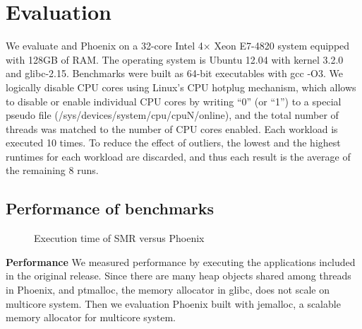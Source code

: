\section{Evaluation}
We evaluate \myds and Phoenix on 
a 32-core Intel 4× Xeon E7-4820 system equipped with 128GB of RAM. 
The operating system is Ubuntu 12.04 with kernel 3.2.0 and glibc-2.15.
Benchmarks were built as 64-bit executables with gcc -O3.
We logically disable CPU cores using Linux’s CPU hotplug mechanism, 
which allows to disable or enable individual CPU cores 
by writing “0” (or “1”) to 
a special pseudo file (/sys/devices/system/cpu/cpuN/online), 
and the total number of threads was matched to the number of CPU cores enabled.
Each workload is executed 10 times. 
To reduce the effect of outliers, 
the lowest and the highest runtimes for each workload are discarded, 
and thus each result is the average of the remaining 8 runs.

\subsection{Performance of benchmarks}

\begin{figure}[htpb]
\centering
  \caption{Execution time of SMR versus Phoenix}
   \label{fig:time}
\end{figure}

{\bf Performance}
We measured \myds performance by executing the applications
included in the original release. 
Since there are many heap objects shared among threads
in Phoenix, and ptmalloc\cite{gloger1997ptmalloc}, 
the memory allocator in glibc, does not scale on multicore system. 
Then we evaluation Phoenix built with jemalloc\cite{evans2006jemalloc}, 
a scalable memory allocator for multicore system.

